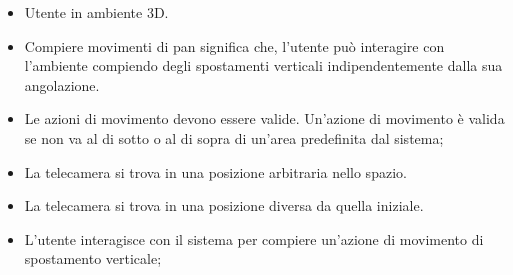     \UCdsc
        { %
            \begin{itemize}
                \item Utente in ambiente 3D.
            \end{itemize}
        }
        { %
            \begin{itemize}
                \item Compiere movimenti di pan significa che, l'utente può interagire con l'ambiente compiendo degli spostamenti verticali indipendentemente dalla sua angolazione.
            \end{itemize}
        }
        { %
            \begin{itemize}
                \item Le azioni di movimento devono essere valide. Un'azione di movimento è valida se non va al di sotto o al di sopra di un'area predefinita dal sistema;
                \item La telecamera si trova in una posizione arbitraria nello spazio.
            \end{itemize}
        }
        { %
            \begin{itemize}
                \item La telecamera si trova in una posizione diversa da quella iniziale.
            \end{itemize}
        }
        { %
            \begin{itemize}
                \item L'utente interagisce con il sistema per compiere un'azione di movimento di spostamento verticale;
            \end{itemize}
        }



